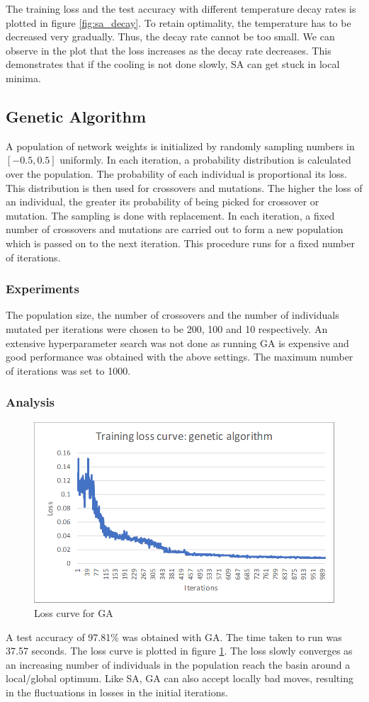 \documentclass[letterpaper]{article}
\begin{document}
	The training loss and the test accuracy with different temperature decay rates is plotted in figure \ref{fig:sa_decay}. To retain optimality, the temperature has to be decreased very gradually. Thus, the decay rate cannot be too small. We can observe in the plot that the loss increases as the decay rate decreases. This demonstrates that if the cooling is not done slowly, SA can get stuck in local minima.
	
	\subsection{Genetic Algorithm}
	A population of network weights is initialized by randomly sampling numbers in $[-0.5, 0.5]$ uniformly. In each iteration, a probability distribution is calculated over the population. The probability of each individual is proportional its loss. This distribution is then used for crossovers and mutations. The higher the loss of an individual, the greater its probability of being picked for crossover or mutation. The sampling is done with replacement. In each iteration, a fixed number of crossovers and mutations are carried out to form a new population which is passed on to the next iteration. This procedure runs for a fixed number of iterations.
	
	\subsubsection{Experiments}
	The population size, the number of crossovers and the number of individuals mutated per iterations were chosen to be 200, 100 and 10 respectively. An extensive hyperparameter search was not done as running GA is expensive and good performance was obtained with the above settings. The maximum number of iterations was set to 1000.
	
	\subsubsection{Analysis}
	\begin{figure}
		\centering
		\begin{minipage}{\textwidth}
			\centering
			\includegraphics[width=.6\linewidth]{../plots/nn_loss_ga}
			\caption{Loss curve for GA}
			\label{fig:ga_loss}
		\end{minipage}
	\end{figure}
	A test accuracy of 97.81\% was obtained with GA. The time taken to run was 37.57 seconds. The loss curve is plotted in figure \ref{fig:ga_loss}. The loss slowly converges as an increasing number of individuals in the population reach the basin around a local/global optimum. Like SA, GA can also accept locally bad moves, resulting in the fluctuations in losses in the initial iterations.
	
\end{document}
